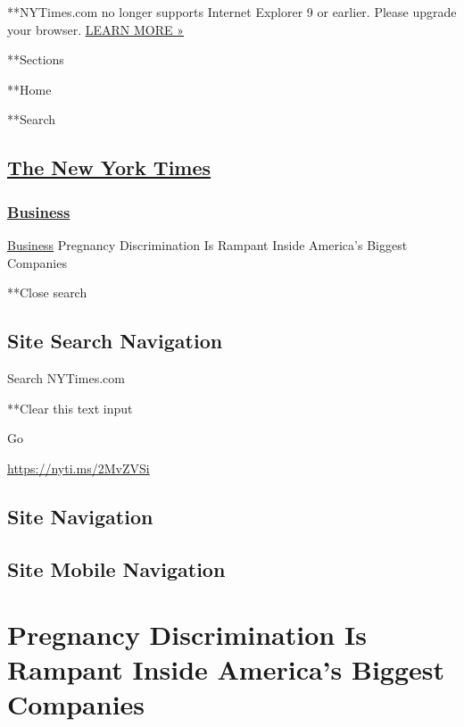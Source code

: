  **NYTimes.com no longer supports Internet Explorer 9 or earlier. Please
upgrade your browser.
\href{http://www.nytimes3xbfgragh.onion/content/help/site/ie9-support.html}{LEARN
MORE »}

**Sections

**Home

**Search

\hypertarget{the-new-york-times}{%
\subsection{\texorpdfstring{\href{http://www.nytimes3xbfgragh.onion/}{The
New York Times}}{The New York Times}}\label{the-new-york-times}}

\hypertarget{-business-}{%
\subsubsection{\texorpdfstring{ \href{/section/business}{Business}
}{ Business }}\label{-business-}}

 \href{/section/business}{Business} \textbar{}Pregnancy Discrimination
Is Rampant Inside America's Biggest Companies

**Close search

\hypertarget{site-search-navigation}{%
\subsection{Site Search Navigation}\label{site-search-navigation}}

Search NYTimes.com

**Clear this text input

Go

\url{https://nyti.ms/2MvZVSi}

\hypertarget{site-navigation}{%
\subsection{Site Navigation}\label{site-navigation}}

\hypertarget{site-mobile-navigation}{%
\subsection{Site Mobile Navigation}\label{site-mobile-navigation}}

\hypertarget{pregnancy-discrimination-is-rampant-inside-americas-biggest-companies}{%
\section{Pregnancy Discrimination Is Rampant Inside America's Biggest
Companies}\label{pregnancy-discrimination-is-rampant-inside-americas-biggest-companies}}

